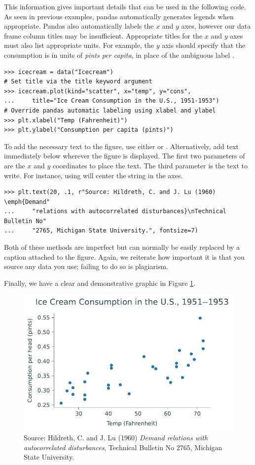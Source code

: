 This information gives important details that can be used in the following code.
As seen in previous examples, pandas automatically generates legends when appropriate.
Pandas also automatically labels the $x$ and $y$ axes, however our data frame column titles may be insufficient.
Appropriate titles for the $x$ and $y$ axes must also list appropriate units.
For example, the $y$ axis should specify that the consumption is in units of \emph{pints per capita}, in place of the ambiguous label .

\begin{lstlisting}
>>> icecream = data("Icecream")
# Set title via the title keyword argument
>>> icecream.plot(kind="scatter", x="temp", y="cons",
...		title="Ice Cream Consumption in the U.S., 1951-1953")
# Override pandas automatic labeling using xlabel and ylabel
>>> plt.xlabel("Temp (Fahrenheit)")
>>> plt.ylabel("Consumption per capita (pints)")
\end{lstlisting}

To add the necessary text to the figure, use either  or .
Alternatively, add text immediately below wherever the figure is displayed.
The first two parameters of  are the $x$ and $y$ coordinates to place the text.
The third parameter is the text to write.
For instance, using  will center the  string in the axes.


\begin{lstlisting}
>>> plt.text(20, .1, r"Source: Hildreth, C. and J. Lu (1960) \emph{Demand"
...     "relations with autocorrelated disturbances}\nTechnical Bulletin No"
...     "2765, Michigan State University.", fontsize=7)
\end{lstlisting}

Both of these methods are imperfect but can normally be easily replaced by a caption attached to the figure.
Again, we reiterate how important it is that you source any data you use; failing to do so is plagiarism.

Finally, we have a clear and demonstrative graphic in Figure \ref{fig:labels}.

\begin{figure}[H]
    \centering
    \includegraphics[width=.7\textwidth]{figures/ice_cream_good.pdf}
    \caption{Source:  Hildreth, C. and J. Lu (1960) \emph{Demand relations with autocorrelated disturbances}, Technical Bulletin No 2765, Michigan State University.}
    \label{fig:labels}
\end{figure}

